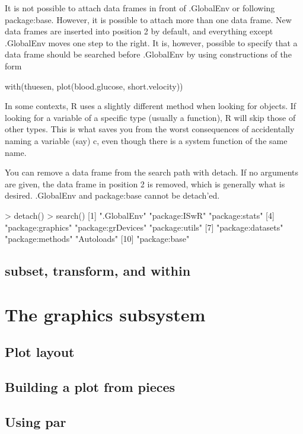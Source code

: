 \documentclass[spanish]{extbook}
\numberwithin{equation}{section}
\numberwithin{figure}{section}
\begin{document}
It is not possible to attach data frames in front of .GlobalEnv or following package:base. However, it is possible to attach more than one
data frame. New data frames are inserted into position 2 by default, and
everything except .GlobalEnv moves one step to the right. It is, however, possible to specify that a data frame should be searched before
.GlobalEnv by using constructions of the form

with(thuesen, plot(blood.glucose, short.velocity))

In some contexts, R uses a slightly different method when looking for objects. If looking for a variable of a specific type (usually a function), R will
skip those of other types. This is what saves you from the worst consequences of accidentally naming a variable (say) c, even though there is a
system function of the same name.

You can remove a data frame from the search path with detach. If no
arguments are given, the data frame in position 2 is removed, which is
generally what is desired. .GlobalEnv and package:base cannot be
detach’ed.

> detach()
> search()
[1] ".GlobalEnv" "package:ISwR" "package:stats"
[4] "package:graphics" "package:grDevices" "package:utils"
[7] "package:datasets" "package:methods" "Autoloads"
[10] "package:base"

\newpage

\subsection{subset, transform, and within}

\section{The graphics subsystem}
\subsection{Plot layout}
\subsection{Building a plot from pieces}
\subsection{Using par}
\end{document}
